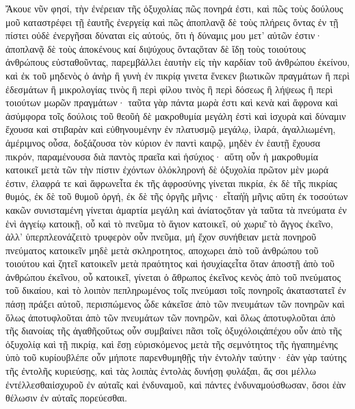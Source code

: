 Ἄκουε νῦν φησί, τὴν ἐνέρειαν τῆς ὀξυχολίας πῶς πονηρά ἐστι, καὶ πῶς τοὺς δούλους μοῦ καταστρέφει τῇ ἑαυτῆς ἐνεργείᾳ καὶ πῶς ἀποπλανᾷ δὲ τοὺς πλήρεις ὄντας ἐν τῇ πίστει οὐδὲ ἐνεργῆσαι δύναται εἰς αὐτούς, ὅτι ἡ δύναμις μου μετ’ αὐτῶν ἐστιν· ἀποπλανᾷ δὲ τοὺς ἀποκένους καί διψύχους ὄνταςὅταν δὲ ἴδῃ τοὺς τοιούτους ἀνθρώπους εὐσταθοῦντας, παρεμβάλλει ἑαυτὴν εἰς τὴν καρδίαν τοῦ ἀνθρώπου ἐκείνου, καὶ ἐκ τοῦ μηδενὸς ὁ ἀνὴρ ἢ γυνὴ ἐν πικρίᾳ γινετα ἕνεκεν βιωτικῶν πραγμάτων ἢ περὶ ἐδεσμάτων ἢ μικρολογίας τινὸς ἢ περὶ φίλου τινὸς ἢ περὶ δόσεως ἢ λήψεως ἢ περὶ τοιούτων μωρῶν πραγμάτων· ταῦτα γὰρ πάντα μωρὰ ἐστι καὶ κενὰ καὶ ἄφρονα καὶ ἀσύμφορα τοῖς δούλοις τοῦ θεοῦἡ δὲ μακροθυμία μεγάλη ἐστὶ καὶ ἰσχυρὰ καὶ δύναμιν ἔχουσα καὶ στιβαρὰν καὶ εὐθηνουμένην ἐν πλατυσμῷ μεγάλῳ, ἱλαρά, ἀγαλλιωμένη, ἀμέριμνος οὖσα, δοξάζουσα τὸν κύριον ἐν παντὶ καιρῷ, μηδὲν ἐν ἑαυτῇ ἔχουσα πικρόν, παραμένουσα διὰ παντὸς πραεῖα καὶ ἡσύχιος· αὕτη οὖν ἡ μακροθυμία κατοικεῖ μετὰ τῶν τὴν πίστιν ἐχόντων ὁλόκληρονἡ δὲ ὀξυχολία πρῶτον μὲν μωρά ἐστιν, ἐλαφρά τε καὶ ἄφρωνεἶτα ἐκ τῆς ἀφροσύνης γίνεται πικρία, ἐκ δὲ τῆς πικρίας θυμός, ἐκ δὲ τοῦ θυμοῦ ὀργή, ἐκ δὲ τῆς ὀργῆς μῆνις· εἶταἡ̓ἡ μῆνις αὕτη ἐκ τοσούτων κακῶν συνισταμένη γίνεται ἁμαρτία μεγάλη καὶ ἀνίατοςὅταν γὰ ταῦτα τὰ πνεύματα ἐν ἑνὶ ἀγγείῳ κατοικῇ, οὗ καὶ τὸ πνεῦμα τὸ ἅγιον κατοικεῖ, οὐ χωριε͂ τὸ ἄγγος ἐκεῖνο, ἀλλ’ ὑπερπλεονάζειτὸ τρυφερὸν οὖν πνεῦμα, μἡ ἔχον συνήθειαν μετὰ πονηροῦ πνεύματος κατοικεῖν μηδὲ μετὰ σκληροτητος, αποχωρει ἀπὸ τοῦ ἀνθρώπου τοῦ τοιούτου καὶ ζητεῖ κατοικεῖν μετὰ πραότητος καὶ ἡσυχίαςεἶτα ὅταν ἀποστῇ ἀπὸ τοῦ ἀνθρώπου ἐκεῖνου, οὗ κατοικεῖ, γίνεται ὁ ἄθρωπος ἐκεῖνος κενὸς ἀπὸ τοῦ πνεύματος τοῦ δικαίου, καὶ τὸ λοιπὸν πεπληρωμένος τοῖς πνεύμασι τοῖς πονηροῖς ἀκαταστατεῖ ἐν πάσῃ πράξει αὐτοῦ, περισπώμενος ὧδε κἀκεῖσε ἀπὸ τῶν πνευμάτων τῶν πονηρῶν καὶ ὅλως ἀποτυφλοῦται ἀπὸ τῶν πνευμάτων τῶν πονηρῶν, καὶ ὅλως ἀποτυφλοῦται ἀπὸ τῆς διανοίας τῆς ἀγαθῆςοὕτως οὖν συμβαίνει πᾶσι τοῖς ὀξυχόλοιςἀπέχου οὖν ἀπὸ τῆς ὀξυχολίᾳ καὶ τῇ πικρίᾳ, καὶ ἔσῃ εὑρισκόμενος μετὰ τῆς σεμνότητος τῆς ἠγαπημένης ὑπὸ τοῦ κυρίουβλέπε οὖν μήποτε παρενθυμηθῇς τὴν ἐντολὴν ταύτην· ἐὰν γὰρ ταύτης τῆς ἐντολῆς κυριεύσῃς, καὶ τὰς λοιπὰς ἐντολὰς δυνήσῃ φυλάξαι, ἅς σοι μέλλω ἐντέλλεσθαιἰσχυροῦ ἐν αὐταῖς καὶ ἐνδυναμοῦ, καὶ πάντες ἐνδυναμούσθωσαν, ὅσοι ἐὰν θέλωσιν ἐν αὐταῖς πορεύεσθαι.

